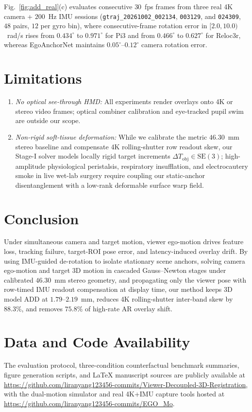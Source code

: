 \documentclass[journal]{IEEEtran}
\begin{document}
Fig.~\ref{fig:add_real}(c) evaluates consecutive $30$~fps frames from three real 4K camera + $200$~Hz IMU sessions (\texttt{gtraj\_20261002\_002134}, \texttt{003129}, and \texttt{024309}, $48$ pairs, $12$ per gyro bin), where consecutive-frame rotation error in $[2.0,10.0)$~rad/s rises from $0.434^\circ$ to $0.971^\circ$ for Pi3 and from $0.466^\circ$ to $0.627^\circ$ for Reloc3r, whereas EgoAnchorNet maintains $0.05^\circ\text{--}0.12^\circ$ camera rotation error.

\section{Limitations}
\begin{enumerate}
    \item \emph{No optical see-through HMD:} All experiments render overlays onto 4K or stereo video frames; optical combiner calibration and eye-tracked pupil swim are outside our scope.
    \item \emph{Non-rigid soft-tissue deformation:} While we calibrate the metric $46.30$~mm stereo baseline and compensate 4K rolling-shutter row readout skew, our Stage-I solver models locally rigid target increments $\Delta T_{\text{obj}} \in \mathrm{SE}(3)$; high-amplitude physiological peristalsis, respiratory insufflation, and electrocautery smoke in live wet-lab surgery require coupling our static-anchor disentanglement with a low-rank deformable surface warp field.
\end{enumerate}

\section{Conclusion}
Under simultaneous camera and target motion, viewer ego-motion drives feature loss, tracking failure, target-ROI pose error, and latency-induced overlay drift. By using IMU-guided de-rotation to isolate stationary scene anchors, solving camera ego-motion and target 3D motion in cascaded Gauss--Newton stages under calibrated $46.30$~mm stereo geometry, and propagating only the viewer pose with row-timed IMU readout compensation at display time, our method keeps 3D model ADD at $1.79\text{--}2.19$~mm, reduces 4K rolling-shutter inter-band skew by $88.3\%$, and removes $75.8\%$ of high-rate AR overlay shift.

\section*{Data and Code Availability}
The evaluation protocol, three-condition counterfactual benchmark summaries, figure generation scripts, and LaTeX manuscript sources are publicly available at \url{https://github.com/liranyang123456-commits/Viewer-Decoupled-3D-Registration}, with the dual-motion simulator and real 4K+IMU capture tools hosted at \url{https://github.com/liranyang123456-commits/EGO_Mo}.
\end{document}
